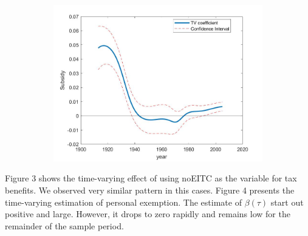\documentclass[12pt,a4paper]{article}
\begin{document}
\begin{figure}[!htp]
	\caption{Time-varying Coefficient for Subsidy}
	\centering
	\begin{subfigure}[b]{0.7\linewidth}
		\includegraphics[width=\linewidth]{CI_n201.jpg}
	\end{subfigure}
\end{figure}

Figure 3 shows the time-varying effect of using noEITC as the variable for tax benefits. We observed very similar pattern in this cases. Figure 4 presents the time-varying estimation of personal exemption. The estimate of $\beta(\tau)$ start out positive and large. However, it drops to zero rapidly and remains low for the remainder of the sample period. 

\end{document}
